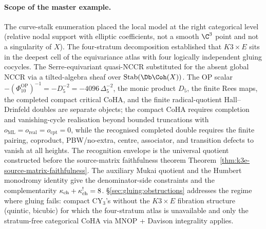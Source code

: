 \paragraph{Scope of the master example.}
The curve-stalk enumeration placed the local model at the right
categorical level (relative nodal support with elliptic coefficients,
not a smooth $\C^3$ point and not a singularity of \(X\)). The four-stratum
decomposition established that $K3 \times E$ sits in the deepest
cell of the equivariance atlas with four logically independent
gluing cocycles. The Serre-equivariant quasi-NCCR substituted for
the absent global NCCR via a tilted-algebra sheaf over
$\mathrm{Stab}(\Db\Coh(X))$. The OP scalar
\(-(\Phi_{10}^{\mathrm{OP}})^{-1}=-D_5^{-2}
=-4096\,\Delta_5^{-2}\), the monic product \(D_5\), the
finite Rees maps, the completed compact critical CoHA, and the finite
radical-quotient Hall--Drinfeld doubles are separate objects; the
compact CoHA requires completion and vanishing-cycle realisation beyond
bounded truncations with
$o_{\mathrm{ML}}=o_{\mathrm{real}}=o_{\mathrm{cpt}}=0$, while the
recognised completed double requires the finite pairing, coproduct,
PBW/no-extra, centre, associator, and transition defects to vanish at
all heights. The recognition envelope is the universal quotient
constructed before the source-matrix faithfulness theorem
Theorem~\ref{thm:k3e-source-matrix-faithfulness}. The
auxiliary Mukai quotient and the Humbert monodromy
identity give the denominator-side constraints and the complementarity
$\kappa_{\mathrm{ch}} + \kappa_{\mathrm{ch}}^! = 8$.
\S\ref{sec:gluing:obstructions} addresses the regime where gluing fails: compact
CY$_3$'s without the $K3 \times E$ fibration structure (quintic,
bicubic) for which the four-stratum atlas is unavailable and
only the stratum-free categorical CoHA via MNOP + Davison
integrality applies.
